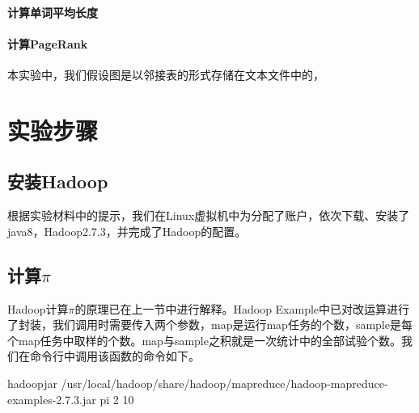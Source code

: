 \documentclass{article}
\begin{document}
\paragraph{计算单词平均长度}



\paragraph{计算PageRank}
本实验中，我们假设图是以邻接表的形式存储在文本文件中的，



\section{实验步骤}

\subsection{安装Hadoop}

根据实验材料中的提示，我们在Linux虚拟机中为分配了账户，依次下载、安装了java8，Hadoop2.7.3，并完成了Hadoop的配置。

\subsection{计算$\pi$}

Hadoop计算$\pi$的原理已在上一节中进行解释。Hadoop Example中已对改运算进行了封装，我们调用时需要传入两个参数，map是运行map任务的个数，sample是每个map任务中取样的个数。map与sample之积就是一次统计中的全部试验个数。我们在命令行中调用该函数的命令如下。
\begin{python}
hadoopjar /usr/local/hadoop/share/hadoop/mapreduce/hadoop-mapreduce-examples-2.7.3.jar pi 2 10
\end{python}
\end{document}
